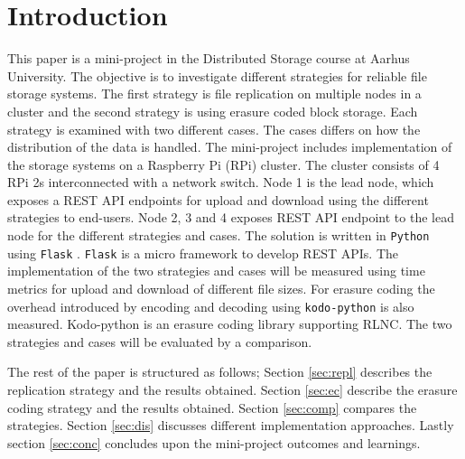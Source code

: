 \section{Introduction}
This paper is a mini-project in the Distributed Storage course at Aarhus University. The objective is to investigate different strategies for reliable file storage systems. The first strategy is file replication on multiple nodes in a cluster and the second strategy is using erasure coded block storage. Each strategy is examined with two different cases. The cases differs on how the distribution of the data is handled. The mini-project includes implementation of the storage systems on a Raspberry Pi (RPi) cluster. The cluster consists of 4 RPi 2s interconnected with a network switch. Node 1 is the lead node, which exposes a REST API endpoints for upload and download using the different strategies to end-users. Node 2, 3 and 4 exposes REST API endpoint to the lead node for the different strategies and cases. The solution is written in \texttt{Python} using \texttt{Flask} \cite{flask}. \texttt{Flask} is a micro framework to develop REST APIs. The implementation of the two strategies and cases will be measured using time metrics for upload and download of different file sizes. For erasure coding the overhead introduced by encoding and decoding using \texttt{kodo-python} \cite{kodo} is also measured. Kodo-python is an erasure coding library supporting RLNC. The two strategies and cases will be evaluated by a comparison.

The rest of the paper is structured as follows; Section \ref{sec:repl} describes the replication strategy and the results obtained. Section \ref{sec:ec} describe the erasure coding strategy and the results obtained. Section \ref{sec:comp} compares the strategies. Section \ref{sec:dis} discusses different implementation approaches. Lastly section \ref{sec:conc} concludes upon the mini-project outcomes and learnings. 